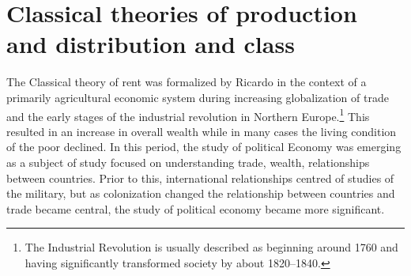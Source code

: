 


\section{Classical theories of production and distribution and class}

The Classical theory of rent was formalized \cite{ricardoEssayInfluenceLow1815}by Ricardo in the context of a primarily agricultural economic system during increasing globalization of trade and  the early stages of the industrial revolution in Northern Europe.\footnote{The Industrial Revolution is usually described as beginning around 1760 and having significantly transformed society by about 1820–1840.}  This resulted in an increase in overall wealth while in many cases the living condition of the poor declined.  In this period, the study of political Economy was emerging as a subject of study focused on understanding trade, wealth, relationships between countries. Prior to this, international relationships centred of studies of the military, but as colonization changed the relationship between countries and trade became central, the study of political economy became more significant. 

